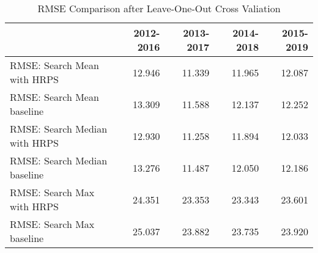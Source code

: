 \begin{table}[ht]
\centering
\begin{tabular}{|l|rrrr}
  \hline
 & 2012-2016 & 2013-2017 & 2014-2018 & 2015-2019 \\ 
  \hline
RMSE: Search Mean with HRPS & 12.946 & 11.339 & 11.965 & 12.087 \\ 
  RMSE: Search Mean baseline & 13.309 & 11.588 & 12.137 & 12.252 \\ 
  RMSE: Search Median with HRPS & 12.930 & 11.258 & 11.894 & 12.033 \\ 
  RMSE: Search Median baseline & 13.276 & 11.487 & 12.050 & 12.186 \\ 
  RMSE: Search Max with HRPS & 24.351 & 23.353 & 23.343 & 23.601 \\ 
  RMSE: Search Max baseline & 25.037 & 23.882 & 23.735 & 23.920 \\ 
   \hline
\end{tabular}
\caption{RMSE Comparison after Leave-One-Out Cross Valiation} 
\end{table}

